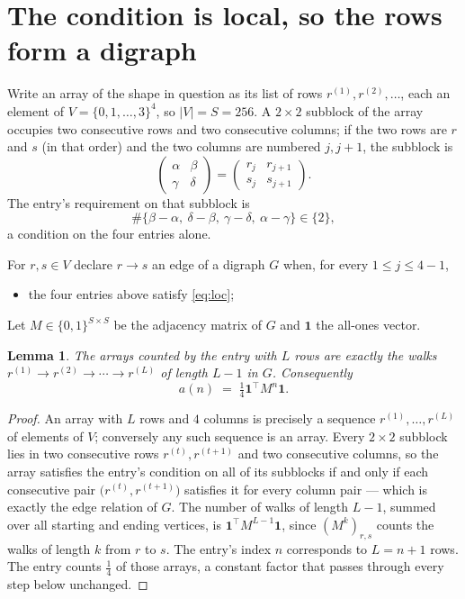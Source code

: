 \documentclass[11pt,a4paper]{article}
\theoremstyle{plain}
\newtheorem{lemma}[theorem]{Lemma}
\theoremstyle{definition}
\begin{document}
\section{The condition is local, so the rows form a digraph}

Write an array of the shape in question as its list of rows
$r^{(1)},r^{(2)},\dots$, each an element of
$V=\{0,1,\dots,3\}^{4}$, so $|V|=S=256$. A $2\times2$ subblock of the array
occupies two consecutive rows and two consecutive columns; if the two rows are $r$
and $s$ (in that order) and the two columns are numbered $j,j+1$,
the subblock is
\[
\begin{pmatrix}\alpha&\beta\\\gamma&\delta\end{pmatrix}=\begin{pmatrix}r_j&r_{j+1}\\s_j&s_{j+1}\end{pmatrix}.
\]
The entry's requirement on that subblock is
\begin{equation}\label{eq:loc}
\#\{\beta-\alpha,\ \delta-\beta,\ \gamma-\delta,\ \alpha-\gamma\}\in\{2\},
\end{equation}
a condition on the four entries alone.

For $r,s\in V$ declare $r\to s$ an edge of a digraph $G$ when, for every
$1\le j\le 4-1$,
\begin{itemize}
\item the four entries above satisfy \eqref{eq:loc};

\end{itemize}
Let $M\in\{0,1\}^{S\times S}$ be the adjacency matrix of $G$ and $\mathbf{1}$ the
all-ones vector.

\begin{lemma}\label{lem:walk}
The arrays counted by the entry with $L$ rows are exactly the walks
$r^{(1)}\to r^{(2)}\to\cdots\to r^{(L)}$ of length $L-1$ in $G$. Consequently
\[
a(n)\;=\;\tfrac1{4}\mathbf{1}^{\!\top}M^{n}\mathbf{1} .
\]
\end{lemma}

\begin{proof}
An array with $L$ rows and $4$ columns is precisely a sequence
$r^{(1)},\dots,r^{(L)}$ of elements of $V$; conversely any such sequence is an array.
Every $2\times2$ subblock lies in two consecutive rows $r^{(t)},r^{(t+1)}$ and two
consecutive columns, so the array satisfies the entry's condition on all of its subblocks
if and only if each consecutive pair $\bigl(r^{(t)},r^{(t+1)}\bigr)$ satisfies it for
every column pair --- which is exactly the edge relation of $G$. The number of walks of
length $L-1$, summed over all starting and ending vertices, is
$\mathbf{1}^{\!\top}M^{L-1}\mathbf{1}$, since $(M^{k})_{r,s}$ counts the walks of
length $k$ from $r$ to $s$. The entry's index $n$ corresponds to $L=n+1$ rows. The entry counts $\tfrac1{4}$ of those arrays, a constant factor that passes through every step below unchanged.
\end{proof}
\end{document}

